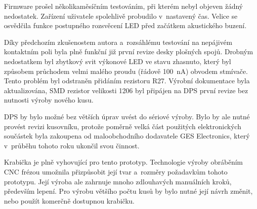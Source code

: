 
Firmware prošel několikaměsíčním testováním, při kterém nebyl objeven žádný
nedostatek. Zařízení uživatele spolehlivě probudilo v~nastavený čas. Velice se
osvědčila funkce postupného rozsvěcení LED před začátkem akustického buzení.

Díky předchozím zkušenostem autora a~rozsáhlému testování na nepájivém
kontaktním poli byla plně funkční již první revize desky plošných spojů.
Drobným nedostatkem byl zbytkový svit výkonové LED ve stavu zhasnuto, který byl
způsobem průchodem velmi malého proudu (řádově \SI{100}{\nano\ampere}) obvodem
stmívače. Tento problém byl odstraněn přidáním rezistoru R27. Výrobní
dokumentace byla aktualizována, SMD rezistor velikosti 1206 byl připájen na DPS
první revize bez nutnosti výroby nového kusu.

DPS by bylo možné bez větších úprav uvést do sériové výroby. Bylo by ale nutné
provést revizi kusovníku, protože poměrně velká část použitých elektronických
součástek byla zakoupena od maloobchodního dodavatele GES Electronics, který
v~průběhu tohoto roku ukončil svou činnost.

Krabička je plně vyhovující pro tento prototyp. Technologie výroby obráběním
CNC frézou umožnila přizpůsobit její tvar a~rozměry požadavkům tohoto
prototypu. Její výroba ale zahrnuje mnoho zdlouhavých manuálních kroků,
především lepení. Pro výrobu většího počtu kusů by bylo nutné její návrh
změnit, nebo použít komerčně dostupnou krabičku.
